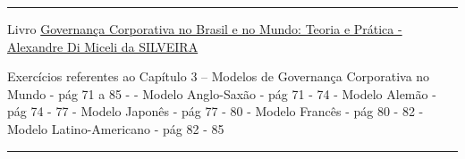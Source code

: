 \documentclass[
]{book}
\begin{document}
\begin{center}\rule{0.5\linewidth}{0.5pt}\end{center}

Livro \href{https://pdfcoffee.com/governana-corporativa-no-brasil-e-no-mundo-pdf-free.html}{Governança Corporativa no Brasil e no Mundo: Teoria e Prática - Alexandre Di Miceli da SILVEIRA}

Exercícios referentes ao Capítulo 3 -- Modelos de Governança Corporativa no Mundo - pág 71 a 85 -
- Modelo Anglo-Saxão - pág 71 - 74
- Modelo Alemão - pág 74 - 77
- Modelo Japonês - pág 77 - 80
- Modelo Francês - pág 80 - 82
- Modelo Latino-Americano - pág 82 - 85

\begin{center}\rule{0.5\linewidth}{0.5pt}\end{center}
\end{document}
